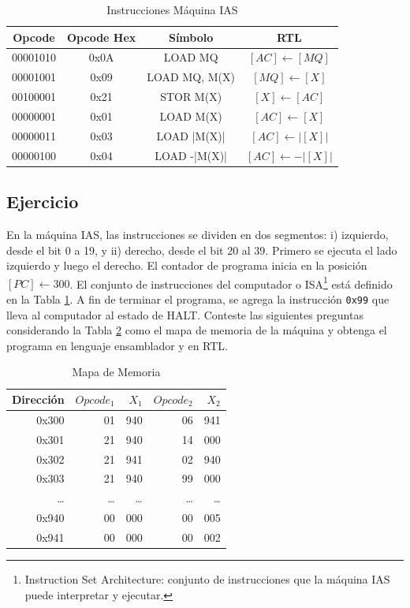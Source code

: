 \documentclass{article}
\begin{document}
\begin{table}[htbp]
  \caption{Instrucciones Máquina IAS}
  \label{tab:tablaISA-IAS}
  \centering
  \begin{tabular}{|cccc|}
    \hline
    Opcode   & Opcode Hex &  Símbolo          & RTL \\ \hline
    00001010 & 0x0A       &  LOAD MQ          & $[AC]\leftarrow[MQ]$\\
    00001001 & 0x09       &  LOAD MQ, M(X)    & $[MQ]\leftarrow[X]$\\
    00100001 & 0x21       &  STOR M(X)        & $[X]\leftarrow[AC]$\\
    00000001 & 0x01       &  LOAD M(X)        & $[AC]\leftarrow[X]$\\
    00000011 & 0x03       &  LOAD |M(X)|      & $[AC]\leftarrow|[X]|$\\
    00000100 & 0x04       &  LOAD -|M(X)|     & $[AC]\leftarrow-|[X]|$\\
    \hline
  \end{tabular}
\end{table}

\newpage

\subsection{Ejercicio}
\label{sec:org33bda74}

En la máquina IAS, las instrucciones se dividen en dos segmentos:
i) izquierdo, desde el bit 0 a 19, y ii) derecho, desde el bit 20 al 39. Primero
se ejecuta el lado izquierdo y luego el derecho. El
contador de programa inicia en la posición \([PC] \leftarrow 300\). El conjunto de
instrucciones del computador o ISA\footnote{Instruction Set Architecture: conjunto de instrucciones que la máquina IAS puede interpretar y ejecutar.} está definido en la Tabla
\ref{tab:tablaISA-IAS}. A fin de terminar el programa, se agrega la
instrucción \texttt{0x99} que lleva al computador al estado de HALT. Conteste las
siguientes preguntas considerando la Tabla \ref{tab:org59f9872} como el
mapa de memoria de la máquina y obtenga el programa en lenguaje ensamblador y en
RTL.

\begin{table}[htbp]
\caption{\label{tab:org59f9872}Mapa de Memoria}
\centering
\begin{tabular}{rrrrr}
\hline
Dirección & \(Opcode_1\) & \(X_1\) & \(Opcode_2\) & \(X_2\)\\[0pt]
\hline
0x300 & 01 & 940 & 06 & 941\\[0pt]
0x301 & 21 & 940 & 14 & 000\\[0pt]
0x302 & 21 & 941 & 02 & 940\\[0pt]
0x303 & 21 & 940 & 99 & 000\\[0pt]
\ldots{} & \ldots{} & \ldots{} & \ldots{} & \ldots{}\\[0pt]
0x940 & 00 & 000 & 00 & 005\\[0pt]
0x941 & 00 & 000 & 00 & 002\\[0pt]
\hline
\end{tabular}
\end{table}
\end{document}

